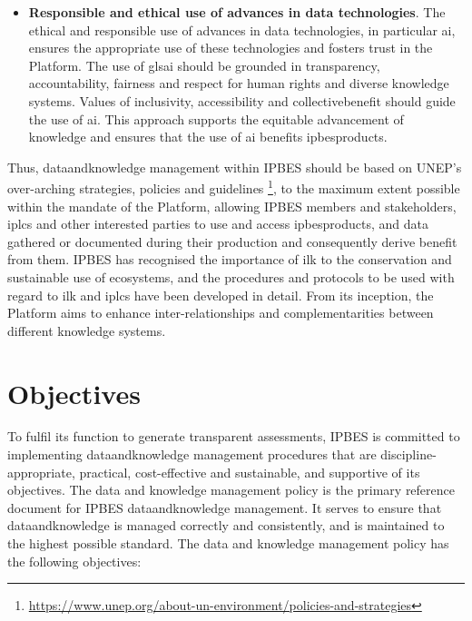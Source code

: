 \documentclass{article}
\begin{document}
\begin{itemize}
    \item \textbf{Responsible and ethical use of advances in data technologies}. The ethical and responsible use of advances in data technologies, in particular \gls{ai}, ensures the appropriate use of these technologies and fosters trust in the Platform. The use of gls{ai} should be grounded in transparency, accountability, fairness and respect for human rights and diverse knowledge systems. Values of inclusivity, accessibility and \gls{collectivebenefit} should guide the use of \gls{ai}. This approach supports the equitable advancement of knowledge and ensures that the use of \gls{ai} benefits \glspl{ipbesproduct}.
\end{itemize}

Thus, \gls{dataandknowledge} management within IPBES should be based on UNEP’s over-arching strategies, policies and guidelines \footnote{\href{https://www.unep.org/about-un-environment/policies-and-strategies}{https://www.unep.org/about-un-environment/policies-and-strategies}}, to the maximum extent possible within the mandate of the Platform, allowing IPBES members and \glspl{stakeholder}, \glspl{iplc} and other interested parties to use and access \glspl{ipbesproduct}, and \gls{data} gathered or documented during their production and consequently derive benefit from them. IPBES has recognised the importance of \gls{ilk} to the conservation and sustainable use of ecosystems, and the procedures and protocols to be used with regard to \gls{ilk} and \glspl{iplc} have been developed in detail. From its inception, the Platform aims to enhance inter-relationships and complementarities between different knowledge systems.

\section{Objectives}

To fulfil its function to generate transparent assessments, IPBES is committed to implementing \gls{dataandknowledge} management procedures that are discipline-appropriate, practical, cost-effective and sustainable, and supportive of its objectives. The data and knowledge management policy is the primary reference document for IPBES \gls{dataandknowledge} management. It serves to ensure that \gls{dataandknowledge} is managed correctly and consistently, and is maintained to the highest possible standard. The data and knowledge management policy has the following objectives:
\end{document}

